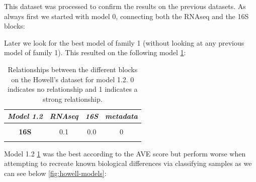 \documentclass[
  12pt,
  a4paper,
  twoside,
  openright]{book}
\begin{document}
This dataset was processed to confirm the results on the previous datasets.
As always first we started with model 0, connecting both the RNAseq and the 16S blocks:

Later we look for the best model of family 1 (without looking at any previous model of family 1).
This resulted on the following model \ref{tab:howell-model1-2}:

\begin{table}[H]

\caption[Models 1.2 of the Howell's dataset.]{\label{tab:howell-model1-2}Relationships between the different blocks on the Howell's dataset for model 1.2. 0 indicates no relationship and 1 indicates a strong relationship.}
\centering
\begin{tabular}[t]{|>{}c|c|c|>{}c|}
\hline
\em{\textbf{Model 1.2}} & \em{\textbf{RNAseq}} & \em{\textbf{16S}} & \em{\textbf{metadata}}\\
\hline
\textbf{\cellcolor{gray!6}{RNAseq}} & \cellcolor{gray!6}{0.0} & \cellcolor{gray!6}{0.1} & \cellcolor{gray!6}{1}\\
\hline
\textbf{16S} & 0.1 & 0.0 & 0\\
\hline
\textbf{\cellcolor{gray!6}{metadata}} & \cellcolor{gray!6}{1.0} & \cellcolor{gray!6}{0.0} & \cellcolor{gray!6}{0}\\
\hline
\end{tabular}
\end{table}

Model 1.2 \ref{tab:howell-model1-2} was the best according to the AVE score but perform worse when attempting to recreate known biological differences via classifying samples as we can see below \ref{fig:howell-models}:
\end{document}
